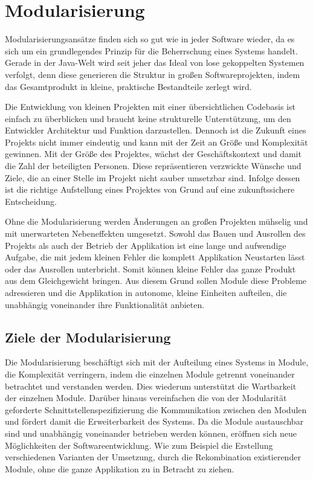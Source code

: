 \chapter{Modularisierung} \label{cha:modularisierung}

  Modularisierungsansätze finden sich so gut wie in jeder Software wieder, da es sich um ein grundlegendes Prinzip für die Beherrschung eines Systems handelt. Gerade in der Java-Welt wird seit jeher das Ideal von lose gekoppelten Systemen verfolgt, denn diese generieren die Struktur in großen Softwareprojekten, indem das Gesamtprodukt in kleine, praktische Bestandteile zerlegt wird. \bigbreak
  
  Die Entwicklung von kleinen Projekten mit einer übersichtlichen Codebasis ist einfach zu überblicken und braucht keine strukturelle Unterstützung, um den Entwickler Architektur und Funktion darzustellen. Dennoch ist die Zukunft eines Projekts nicht immer eindeutig und kann mit der Zeit an Größe und Komplexität gewinnen. Mit der Größe des Projektes, wächst der Geschäftskontext und damit die Zahl der beteiligten Personen. Diese repräsentieren verzwickte Wünsche und Ziele, die an einer Stelle im Projekt nicht sauber umsetzbar sind. Infolge dessen ist die richtige Aufstellung eines Projektes von Grund auf eine zukunftssichere Entscheidung.\bigbreak 

  Ohne die Modularisierung werden Änderungen an großen Projekten mühselig und mit unerwarteten Nebeneffekten umgesetzt. Sowohl das Bauen und Ausrollen des Projekts als auch der Betrieb der Applikation ist eine lange und aufwendige Aufgabe, die mit jedem kleinen Fehler die komplett Applikation Neustarten lässt oder das Ausrollen unterbricht. Somit können kleine Fehler das ganze Produkt aus dem Gleichgewicht bringen. Aus diesem Grund sollen Module diese Probleme adressieren und die Applikation in autonome, kleine Einheiten aufteilen, die unabhängig voneinander ihre Funktionalität anbieten.

  \section{Ziele der Modularisierung} \label{sec:ZdM}
    Die Modularisierung beschäftigt sich mit der Aufteilung eines Systems in Module, die Komplexität verringern, indem die einzelnen Module getrennt voneinander betrachtet und verstanden werden. Dies wiederum unterstützt die Wartbarkeit der einzelnen Module. Darüber hinaus vereinfachen die von der Modularität geforderte Schnittstellenspezifizierung die Kommunikation zwischen den Modulen und fördert damit die Erweiterbarkeit des Systems. Da die Module austauschbar sind und unabhängig voneinander betrieben werden können, eröffnen sich neue Möglichkeiten der Softwareentwicklung. Wie zum Beispiel die Erstellung verschiedenen Varianten der Umsetzung, durch die Rekombination existierender Module, ohne die ganze Applikation zu in Betracht zu ziehen.\cite{javaMod9,java9modRevealed,explorJava9}\bigbreak

